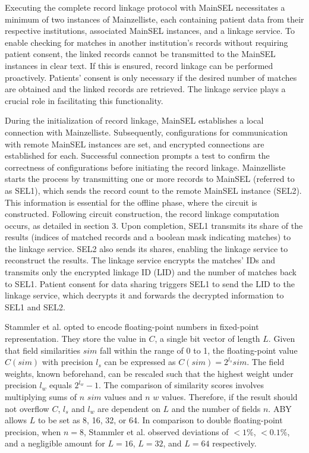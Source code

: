 Executing the complete record linkage protocol with \ac{MainSEL} necessitates a minimum of two instances of Mainzelliste, each containing patient data from their respective institutions, associated \ac{MainSEL} instances, and a linkage service.
To enable checking for matches in another institution's records without requiring patient consent, the linked records cannot be transmitted to the \ac{MainSEL} instances in clear text.
If this is ensured, record linkage can be performed proactively.
Patients' consent is only necessary if the desired number of matches are obtained and the linked records are retrieved.
The linkage service plays a crucial role in facilitating this functionality.

During the initialization of record linkage, MainSEL establishes a local connection with Mainzelliste.
Subsequently, configurations for communication with remote MainSEL instances are set, and encrypted connections are established for each.
Successful connection prompts a test to confirm the correctness of configurations before initiating the record linkage.
Mainzelliste starts the process by transmitting one or more records to MainSEL (referred to as SEL1), which sends the record count to the remote MainSEL instance (SEL2).
This information is essential for the offline phase, where the circuit is constructed.
Following circuit construction, the record linkage computation occurs, as detailed in section 3.
Upon completion, SEL1 transmits its share of the results (indices of matched records and a boolean mask indicating matches) to the linkage service.
SEL2 also sends its shares, enabling the linkage service to reconstruct the results.
The linkage service encrypts the matches' IDs and transmits only the encrypted linkage ID (LID) and the number of matches back to SEL1.
Patient consent for data sharing triggers SEL1 to send the LID to the linkage service, which decrypts it and forwards the decrypted information to SEL1 and SEL2.

Stammler et al. opted to encode floating-point numbers in fixed-point representation. %
They store the value in $C$, a single bit vector of length $L$.
Given that field similarities $sim$ fall within the range of 0 to 1, the floating-point value $C(sim)$ with precision $l_s$ can be expressed as $C(sim)=2^{l_s}sim$. The field weights, known beforehand, can be rescaled such that the highest weight under precision $l_w$ equals $2^{l_w}-1$.
The comparison of similarity scores involves multiplying sums of $n$ $sim$ values and $n$ $w$ values.
Therefore, if the result should not overflow $C$, $l_s$ and $l_w$ are dependent on $L$ and the number of fields $n$.
\ac{ABY} allows $L$ to be set as 8, 16, 32, or 64.
In comparison to double floating-point precision, when $n=8$, Stammler et al. observed deviations of $<1\%$, $<0.1\%$, and a negligible amount for $L=16$, $L=32$, and $L=64$ respectively.

